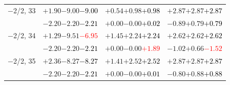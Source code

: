 \documentclass[compress]{beamer}
\begin{document}
\begin{frame}
\begin{tabular}{r | c | c | c}
$-$2/2, 33 & $+1.90$\hspace{0.1 cm}$-9.00$\hspace{0.1 cm}\textcolor{black}{$-9.00$} & $+0.54$\hspace{0.1 cm}$+0.98$\hspace{0.1 cm}\textcolor{black}{$+0.98$} & $+2.87$\hspace{0.1 cm}$+2.87$\hspace{0.1 cm}\textcolor{black}{$+2.87$} \\
           & $-2.20$\hspace{0.1 cm}$-2.20$\hspace{0.1 cm}\textcolor{black}{$-2.21$} & $+0.00$\hspace{0.1 cm}$-0.00$\hspace{0.1 cm}\textcolor{black}{$+0.02$} & $-0.89$\hspace{0.1 cm}$+0.79$\hspace{0.1 cm}\textcolor{black}{$+0.79$} \\
$-$2/2, 34 & $+1.29$\hspace{0.1 cm}$-9.51$\hspace{0.1 cm}\textcolor{red}{$-6.95$} & $+1.45$\hspace{0.1 cm}$+2.24$\hspace{0.1 cm}\textcolor{black}{$+2.24$} & $+2.62$\hspace{0.1 cm}$+2.62$\hspace{0.1 cm}\textcolor{black}{$+2.62$} \\
           & $-2.20$\hspace{0.1 cm}$-2.20$\hspace{0.1 cm}\textcolor{black}{$-2.21$} & $+0.00$\hspace{0.1 cm}$-0.00$\hspace{0.1 cm}\textcolor{red}{$+1.89$} & $-1.02$\hspace{0.1 cm}$+0.66$\hspace{0.1 cm}\textcolor{red}{$-1.52$} \\
$-$2/2, 35 & $+2.36$\hspace{0.1 cm}$-8.27$\hspace{0.1 cm}\textcolor{black}{$-8.27$} & $+1.41$\hspace{0.1 cm}$+2.52$\hspace{0.1 cm}\textcolor{black}{$+2.52$} & $+2.87$\hspace{0.1 cm}$+2.87$\hspace{0.1 cm}\textcolor{black}{$+2.87$} \\
           & $-2.20$\hspace{0.1 cm}$-2.20$\hspace{0.1 cm}\textcolor{black}{$-2.21$} & $+0.00$\hspace{0.1 cm}$-0.00$\hspace{0.1 cm}\textcolor{black}{$+0.01$} & $-0.80$\hspace{0.1 cm}$+0.88$\hspace{0.1 cm}\textcolor{black}{$+0.88$} \\

\end{tabular}
\end{frame}
\end{document}

